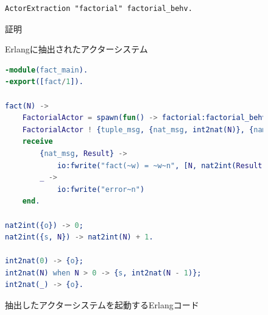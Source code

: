 \begin{figure}[tp]
\begin{lstlisting}
ActorExtraction "factorial" factorial_behv.
\end{lstlisting}
\label{code:overview:extraction}
\caption{証明}
\end{figure}

\begin{figure}
  
  \label{code:overview:fact-impl-erl}
  \caption{Erlangに抽出されたアクターシステム}
\end{figure}

\begin{figure}
\begin{lstlisting}[language=Erlang]
-module(fact_main).
-export([fact/1]).

fact(N) ->
    FactorialActor = spawn(fun() -> factorial:factorial_behv({tt}) end),
    FactorialActor ! {tuple_msg, {nat_msg, int2nat(N)}, {name_msg, self()}},
    receive
        {nat_msg, Result} ->
            io:fwrite("fact(~w) = ~w~n", [N, nat2int(Result)]);
        _ ->
            io:fwrite("error~n")
    end.

nat2int({o}) -> 0;
nat2int({s, N}) -> nat2int(N) + 1.

int2nat(0) -> {o};
int2nat(N) when N > 0 -> {s, int2nat(N - 1)};
int2nat(_) -> {o}.
\end{lstlisting}
\label{code:overview:run}
\caption{抽出したアクターシステムを起動するErlangコード}
\end{figure}
